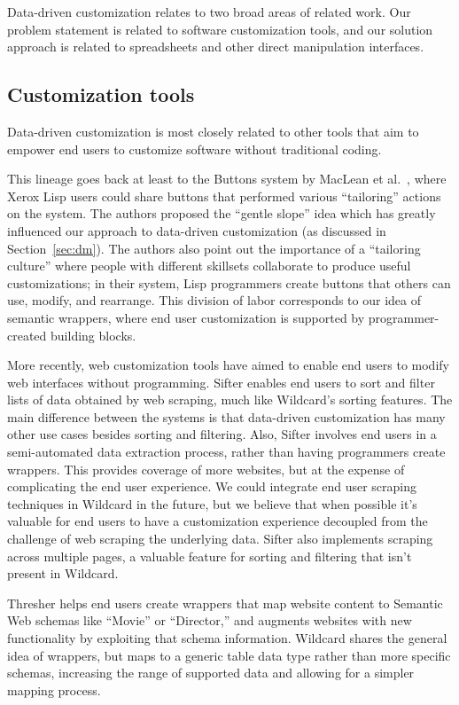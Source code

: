 \documentclass[sigplan,screen,10pt,anonymous,review]{acmart}
\begin{document}
Data-driven customization relates to two broad areas of related work.
Our problem statement is related to software customization tools, and
our solution approach is related to spreadsheets and other direct
manipulation interfaces.

\hypertarget{customization-tools}{%
\subsection{Customization tools}\label{customization-tools}}

Data-driven customization is most closely related to other tools that
aim to empower end users to customize software without traditional
coding.

This lineage goes back at least to the Buttons system by MacLean et
al.~\citep{maclean1990}, where Xerox Lisp users could share buttons that
performed various ``tailoring'' actions on the system. The authors
proposed the ``gentle slope'' idea which has greatly influenced our
approach to data-driven customization (as discussed in
Section~\ref{sec:dm}). The authors also point out the importance of a
``tailoring culture'' where people with different skillsets collaborate
to produce useful customizations; in their system, Lisp programmers
create buttons that others can use, modify, and rearrange. This division
of labor corresponds to our idea of semantic wrappers, where end user
customization is supported by programmer-created building blocks.

More recently, web customization tools have aimed to enable end users to
modify web interfaces without programming. Sifter \citep{huynh2006}
enables end users to sort and filter lists of data obtained by web
scraping, much like Wildcard's sorting features. The main difference
between the systems is that data-driven customization has many other use
cases besides sorting and filtering. Also, Sifter involves end users in
a semi-automated data extraction process, rather than having programmers
create wrappers. This provides coverage of more websites, but at the
expense of complicating the end user experience. We could integrate end
user scraping techniques in Wildcard in the future, but we believe that
when possible it's valuable for end users to have a customization
experience decoupled from the challenge of web scraping the underlying
data. Sifter also implements scraping across multiple pages, a valuable
feature for sorting and filtering that isn't present in Wildcard.

Thresher \citep{hogue2005} helps end users create wrappers that map
website content to Semantic Web schemas like ``Movie'' or ``Director,''
and augments websites with new functionality by exploiting that schema
information. Wildcard shares the general idea of wrappers, but maps to a
generic table data type rather than more specific schemas, increasing
the range of supported data and allowing for a simpler mapping process.
\end{document}
